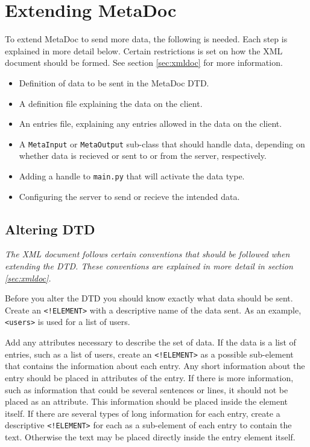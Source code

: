 \documentclass[titlepage, a4paper,10pt]{article}
\begin{document}
\newpage
\section{Extending MetaDoc}
To extend MetaDoc to send more data, the following is needed. Each step is 
explained in more detail below. Certain restrictions is set on how the XML
document should be formed. See section \ref{sec:xmldoc} for more information.

\begin{itemize}
    \item
        Definition of data to be sent in the MetaDoc DTD.
    \item
        A definition file explaining the data on the client.
    \item
        An entries file, explaining any entries allowed in the data on the 
        client.
    \item
        A \texttt{MetaInput} or \texttt{MetaOutput} sub-class that should
        handle data, depending on whether data is recieved or sent to or from
        the server, respectively.
    \item
        Adding a handle to \texttt{main.py} that will activate the data type.
    \item
        Configuring the server to send or recieve the intended data.
\end{itemize}

\subsection{Altering DTD}
\textit{The XML document follows certain conventions that should be followed when
extending the DTD. These conventions are explained in more detail in section
\ref{sec:xmldoc}.}

Before you alter the DTD you should know exactly what data should be sent.
Create an \texttt{<!ELEMENT>} with a descriptive name of the data sent. As an
example, \texttt{<users>} is used for a list of users. 

Add any attributes necessary to describe the set of data. If the data is a list
of entries, such as a list of users, create an \texttt{<!ELEMENT>} as a
possible sub-element that contains the information about each entry. Any short
information about the entry should be placed in attributes of the entry. If
there is more information, such as information that could be several sentences
or lines, it should not be placed as an attribute. This information should be
placed inside the element itself. If there are several types of long
information for each entry, create a descriptive \texttt{<!ELEMENT>} for each
as a sub-element of each entry to contain the text. Otherwise the text may be
placed directly inside the entry element itself. 
\end{document}
